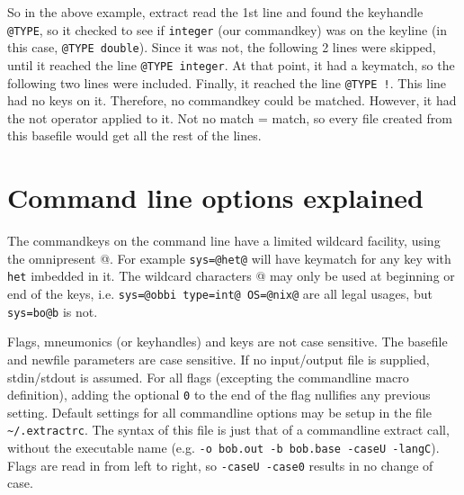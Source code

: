 So in the above example, extract read the 1st line and found the keyhandle
{\tt @TYPE}, so it checked to see if {\tt integer} (our commandkey) was
on the keyline (in this case, {\tt @TYPE double}).  Since it was not,
the following 2 lines were skipped, until it reached the line
{\tt @TYPE integer}.  At that point, it had a keymatch, so the following
two lines were included. Finally, it reached the line {\tt @TYPE !}.
This line had no keys on it.  Therefore, no commandkey could be matched.
However, it had the not operator applied to it.  Not no match = match,
so every file created from this basefile would get all the rest of the
lines.

\section{Command line options explained}
The commandkeys on the command line have a limited wildcard facility, using
the omnipresent @.  For example {\tt sys=@het@} will have keymatch
for any key with {\tt het} imbedded in it.  The wildcard characters
@ may only be used at beginning or end of the keys, i.e.
{\tt sys=@obbi type=int@ OS=@nix@} are all legal usages, but
{\tt sys=bo@b} is not.

Flags, mneumonics (or keyhandles) and keys are not case sensitive.
The basefile and newfile parameters are case sensitive.
If no input/output file is supplied, stdin/stdout is assumed.
For all flags (excepting the commandline macro definition), 
adding the optional {\tt 0} to the end of the flag nullifies any previous
setting.  Default settings for all commandline options may be setup in
the file \verb+~/.extractrc+.  The syntax of this file is just that of
a commandline extract call, without the executable name (e.g.
{\tt -o bob.out -b bob.base -caseU -langC}).  Flags are read in from
left to right, so {\tt -caseU -case0} results  in no change of case.

